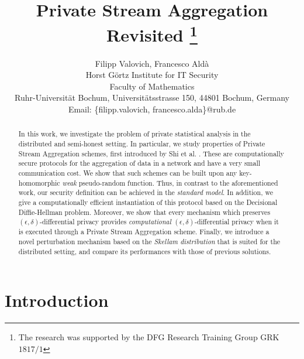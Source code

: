 \documentclass[10pt]{extarticle}
\title{Private Stream Aggregation Revisited
\thanks{The research was supported by the DFG Research Training Group GRK $1817/1$}
}
\author{
Filipp Valovich, Francesco Ald\`{a}\\ Horst G\"{o}rtz Institute for IT Security\\ Faculty of Mathematics\\ Ruhr-Universit\"{a}t Bochum, Universit\"{a}tsstrasse 150, 44801 Bochum, Germany\\ Email: \{filipp.valovich, francesco.alda\}@rub.de
}
\date{}
\begin{document}
\maketitle

\pagestyle{empty}



\begin{abstract} \noindent In this work, we investigate the problem of private statistical analysis in the distributed and semi-honest setting. In particular, we study properties of Private Stream Aggregation schemes, first introduced by Shi et al. \cite{2}. These are computationally secure protocols for the aggregation of data in a network and have a very small communication cost. We show that such schemes can be built upon any key-homomorphic \textit{weak} pseudo-random function. Thus, in contrast to the aforementioned work, our security definition can be achieved in the \textit{standard model}. In addition, we give a computationally efficient instantiation of this protocol based on the Decisional Diffie-Hellman problem. 
Moreover, we show that every mechanism which preserves $(\epsilon,\delta)$-differential privacy provides \textit{computational} $(\epsilon,\delta)$-differential privacy when it is executed through a Private Stream Aggregation scheme. Finally, we introduce a novel perturbation mechanism based on the \textit{Skellam distribution} that is suited for the distributed setting, and compare its performances with those of previous solutions.
\end{abstract}

\section{Introduction}
\end{document}
